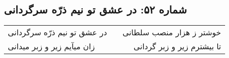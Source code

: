 \begin{center}
\section*{شماره ۵۲: در عشق تو نیم ذرّه سرگردانی}
\label{sec:052}
\begin{longtable}{l p{0.5cm} r}
در عشق تو نیم ذرّه سرگردانی
&&
خوشتر ز هزار منصب سلطانی
\\
زان میآیم زیر و زبر میدانی
&&
تا بیشترم زیر و زبر گردانی
\\
\end{longtable}
\end{center}
